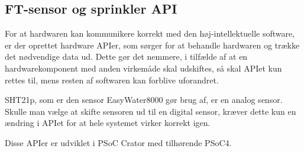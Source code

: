 \subsection{FT-sensor og sprinkler API}

For at hardwaren kan kommunikere korrekt med den høj-intellektuelle software, er der oprettet hardware APIer, som sørger for at behandle hardwaren og trække det nødvendige data ud. Dette gør det nemmere, i tilfælde af at en hardwarekomponent med anden virkemåde skal udskiftes, så skal APIet kun rettes til, mens resten af softwaren kan forblive uforandret. 

SHT21p, som er den sensor EasyWater8000 gør brug af, er en analog sensor. Skulle man vælge at skifte sensoren ud til en digital sensor, kræver dette kun en ændring i APIet for at hele systemet virker korrekt igen. 

Disse APIer er udviklet i PSoC Crator med tilhørende PSoC4. 
